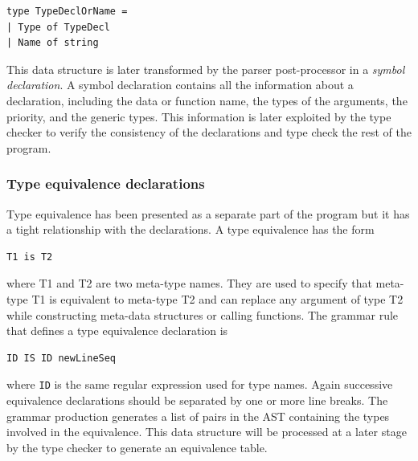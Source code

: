 \begin{lstlisting}
type TypeDeclOrName =
| Type of TypeDecl
| Name of string
\end{lstlisting}

This data structure is later transformed by the parser post-processor in a \textit{symbol declaration}. A symbol declaration contains all the information about a declaration, including the data or function name, the types of the arguments, the priority, and the generic types. This information is later exploited by the type checker to verify the consistency of the declarations and type check the rest of the program.

\subsubsection{Type equivalence declarations}
Type equivalence has been presented as a separate part of the program but it has a tight relationship with the declarations. A type equivalence has the form

\begin{lstlisting}
T1 is T2
\end{lstlisting}

where T1 and T2 are two meta-type names. They are used to specify that meta-type T1 is equivalent to meta-type T2 and can replace any argument of type T2 while constructing meta-data structures or calling functions. The grammar rule that defines a type equivalence declaration is

\begin{lstlisting}
ID IS ID newLineSeq
\end{lstlisting}

\noindent
where \texttt{ID} is the same regular expression used for type names. Again successive equivalence declarations should be separated by one or more line breaks. The grammar production generates a list of pairs in the AST containing the types involved in the equivalence. This data structure will be processed at a later stage by the type checker to generate an equivalence table.

